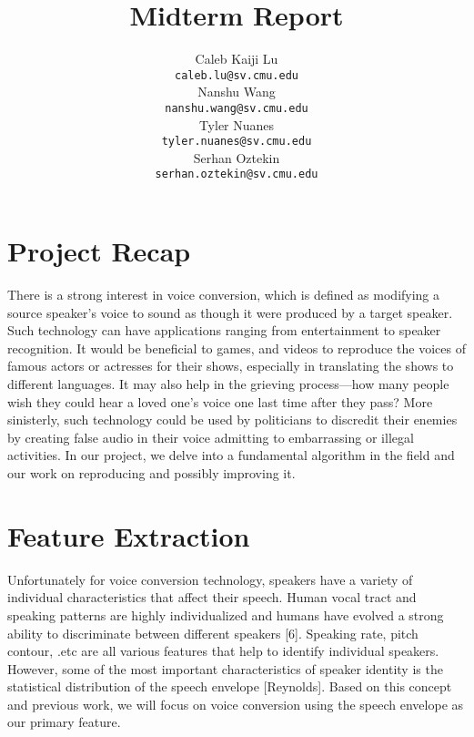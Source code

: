 \documentclass{article}
\title{Midterm Report}
\author{
  Caleb Kaiji Lu\\
  \texttt{caleb.lu@sv.cmu.edu} \\
  \And
  Nanshu Wang\\
  \texttt{nanshu.wang@sv.cmu.edu} \\
   \And
  Tyler Nuanes\\
  \texttt{tyler.nuanes@sv.cmu.edu} \\
  \And
   Serhan Oztekin\\
  \texttt{serhan.oztekin@sv.cmu.edu} \\
}
\begin{document}

\maketitle



\section{Project Recap}

There is a strong interest in voice conversion, which is defined as modifying a source speaker's voice to sound as though it were produced by a target speaker. Such technology can have applications ranging from entertainment to speaker recognition. It would be beneficial to games, and videos to reproduce the voices of famous actors or actresses for their shows, especially in translating the shows to different languages. It may also help in the grieving process---how many people wish they could hear a loved one's voice one last time after they pass? More sinisterly, such technology could be used by politicians to discredit their enemies by creating false audio in their voice admitting to embarrassing or illegal activities. In our project, we delve into a fundamental algorithm in the field and our work on reproducing and possibly improving it.

\section{Feature Extraction}
Unfortunately for voice conversion technology, speakers have a variety of individual characteristics that affect their speech. Human vocal tract and speaking patterns are highly individualized and humans have evolved a strong ability to discriminate between different speakers [6].  Speaking rate, pitch contour, .etc are all various features that help to identify individual speakers. However, some of the most important characteristics of speaker identity is the statistical distribution of the speech envelope [Reynolds]. Based on this concept and previous work, we will focus on voice conversion using the speech envelope as our primary feature.
 
\end{document}
